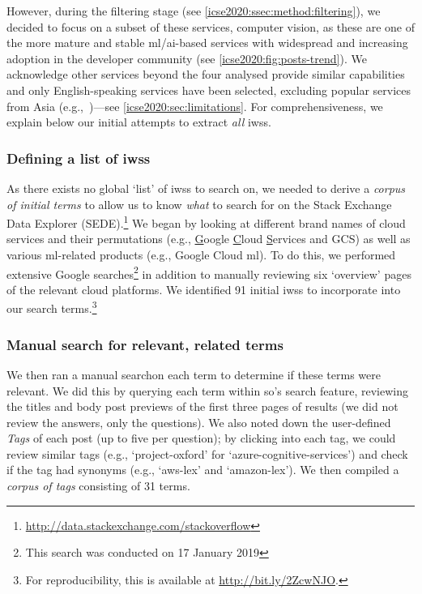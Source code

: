 However, during the filtering stage (see \cref{icse2020:ssec:method:filtering}), we decided to focus on a subset of these services, computer vision, as these are one of the more mature and stable \gls{ml}/\gls{ai}-based services with widespread and increasing adoption in the developer community (see \cref{icse2020:fig:posts-trend}). We acknowledge other services beyond the four analysed provide similar capabilities~ and only English-speaking services have been selected, excluding popular services from Asia (e.g.,~)---see \cref{icse2020:sec:limitations}. For comprehensiveness, we explain below our initial attempts to extract \textit{all} \glspl{iws}. %

\subsubsection{Defining a list of \glspl{iws}}
As there exists no global `list' of \glspl{iws} to search on, we needed to derive a \textit{corpus of initial terms} to allow us to know \textit{what} to search for on the Stack Exchange Data Explorer (SEDE).\footnote{\url{http://data.stackexchange.com/stackoverflow}} We began by looking at different brand names of cloud services and their permutations (e.g., \uline{G}oogle \uline{C}loud \uline{S}ervices and GCS) as well as various \gls{ml}-related products (e.g., Google Cloud \gls{ml}). To do this, we performed extensive Google searches\footnote{This search was conducted on 17 January 2019}\def\footnotesearchdate{2} in addition to manually reviewing six `overview' pages of the relevant cloud platforms. We identified 91 initial \glspl{iws} to incorporate into our search terms.\footnote{For reproducibility, this is available at \url{http://bit.ly/2ZcwNJO}.}\def\footnotereproducability{3}

\subsubsection{Manual search for relevant, related terms}
We then ran a manual search\footnotemark[\footnotesearchdate{}] %
on each term to determine if these terms were relevant. We did this by querying each term within \gls{so}'s search feature, reviewing the titles and body post previews of the first three pages of results (we did not review the answers, only the questions). We also noted down the user-defined \textit{Tags} of each post (up to five per question); by clicking into each tag, we could review similar tags (e.g., `project-oxford' for `azure-cognitive-services') and check if the tag had synonyms (e.g., `aws-lex' and `amazon-lex'). We then compiled a \textit{corpus of tags} consisting of 31 terms.

